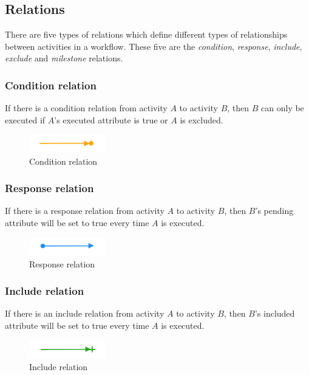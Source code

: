 \documentclass{article}
\begin{document}
		\subsection{Relations}
		There are five types of relations which define different types of relationships between activities in a workflow. 
		These five are the \emph{condition}, \emph{response}, \emph{include}, \emph{exclude} and \emph{milestone} relations.

			\subsubsection{Condition relation}
			If there is a condition relation from activity $A$ to activity $B$, then $B$ can only be executed if $A$'s executed attribute is true or $A$ is excluded.
			\begin{figure}[!ht]
				\centering
				\includegraphics[width=0.3\textwidth]{figures/ConditionRelation.png}
			 	\caption[Condition relation]
			 	{Condition relation}
			\end{figure}

			\subsubsection{Response relation}
			If there is a response relation from activity $A$ to activity $B$, then $B$'s pending attribute will be set to true every time $A$ is executed.
			\begin{figure}[!ht]
				\centering
				\includegraphics[width=0.3\textwidth]{figures/ResponseRelation.png}
			 	\caption[Response relation]
			 	{Response relation}
			\end{figure}

			\subsubsection{Include relation}
			If there is an include relation from activity $A$ to activity $B$, then $B$'s included attribute will be set to true every time $A$ is executed.
			\begin{figure}[!ht]
				\centering
				\includegraphics[width=0.3\textwidth]{figures/IncludeRelation.png}
			 	\caption[Include relation]
			 	{Include relation}
			\end{figure}
\end{document}
